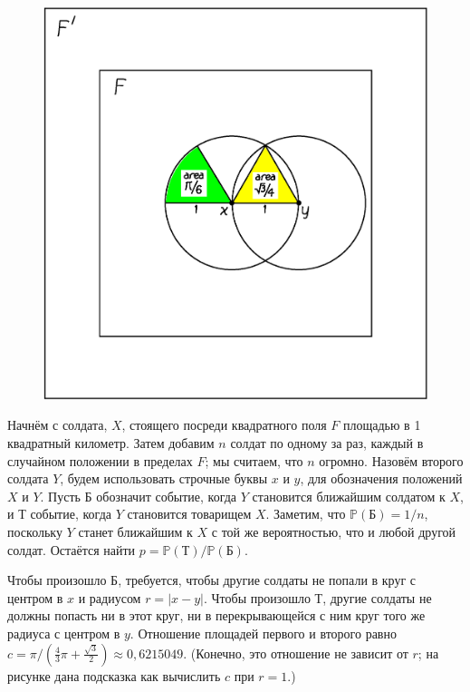 \begin{figure}[h!]
\centering
\includegraphics[scale=0.5]{Figs/Toughies/disks}
\end{figure}%

Начнём с солдата, $X$, стоящего посреди квадратного поля $F$ площадью в 1 квадратный километр.
Затем добавим $n$ солдат по одному за раз, каждый в случайном положении в пределах $F$; мы считаем, что $n$ огромно.
Назовём второго солдата $Y$, будем использовать строчные буквы $x$ и $y$, для обозначения положений $X$ и $Y$.
Пусть $\text{Б}$ обозначит событие, когда $Y$ становится ближайшим солдатом к $X$, 
и $\text{Т}$ событие, когда $Y$ становится товарищем $X$.
Заметим, что $\mathbb{P}(\text{Б})=1/n$, поскольку $Y$ станет ближайшим к $X$ с той же вероятностью, что и любой другой солдат.
Остаётся найти $p=\mathbb{P}(\text{Т})/\mathbb{P}(\text{Б})$.

Чтобы произошло $\text{Б}$, требуется, чтобы другие солдаты не попали в круг с центром в $x$ и радиусом $r=|x-y|$.
Чтобы произошло $\text{Т}$, другие солдаты не должны попасть ни в этот круг, ни в перекрывающейся с ним круг того же радиуса с центром в $y$.
Отношение площадей первого и второго равно $c=\pi/(\tfrac43\pi+\tfrac{\sqrt{3}}{2}) \approx 0{,}6215049$. (Конечно, это отношение не зависит от $r$; на рисунке дана подсказка как вычислить $c$ при $r=1$.)

